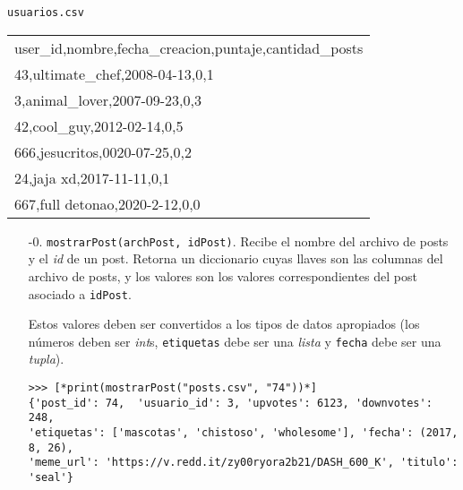 \begin{center}
    \texttt{usuarios.csv} \\
	\begin{tabular}{|l|}
		\hline
user\_id,nombre,fecha\_creacion,puntaje,cantidad\_posts\\
43,ultimate\_chef,2008-04-13,0,1\\
3,animal\_lover,2007-09-23,0,3\\
42,cool\_guy,2012-02-14,0,5\\
666,jesucritos,0020-07-25,0,2\\
24,jaja xd,2017-11-11,0,1\\
667,full detonao,2020-2-12,0,0\\
		\hline
	\end{tabular}
\end{center}

\begin{enumerate}
    \item[-0.] \texttt{mostrarPost(archPost, idPost)}. Recibe el nombre del archivo de posts y el \textit{id} de un post. Retorna un diccionario cuyas llaves son las columnas del archivo de posts, y los valores son los valores correspondientes del post asociado a \texttt{idPost}. 
    
    Estos valores deben ser convertidos a los tipos de datos apropiados (los números deben ser \textit{int}s, \texttt{etiquetas} debe ser una \textit{lista} y \texttt{fecha} debe ser una \textit{tupla}).

    \begin{lstlisting}[style=consola]
>>> [*print(mostrarPost("posts.csv", "74"))*]
{'post_id': 74,  'usuario_id': 3, 'upvotes': 6123, 'downvotes': 248,
'etiquetas': ['mascotas', 'chistoso', 'wholesome'], 'fecha': (2017, 8, 26),
'meme_url': 'https://v.redd.it/zy00ryora2b21/DASH_600_K', 'titulo': 'seal'}
    \end{lstlisting}

\end{enumerate}
